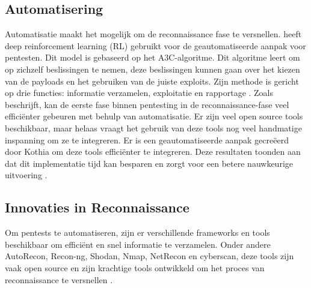 \subsection{Automatisering}
Automatisatie maakt het mogelijk om de reconnaissance fase te versnellen. 
\textcite{Hoang} heeft deep reinforcement learning (RL) gebruikt voor de geautomatiseerde aanpak voor pentesten. 
Dit model is gebaseerd op het A3C-algoritme. Dit algoritme leert om op zichzelf beslissingen te nemen, deze beslissingen kunnen gaan over het kiezen van de payloads en het gebruiken van de juiste exploits. 
Zijn methode is gericht op drie functies: informatie verzamelen, exploitatie en rapportage \autocite{Hoang}.
Zoals \textcite{Kothia} beschrijft, kan de eerste fase binnen pentesting in de reconnaissance-fase veel efficiënter gebeuren met behulp van automatisatie. 
Er zijn veel open source tools beschikbaar, maar helaas vraagt het gebruik van deze tools nog veel handmatige inspanning om ze te integreren.
Er is een geautomatiseerde aanpak gecreëerd door Kothia om deze tools efficiënter te integreren. 
Deze resultaten toonden aan dat dit implementatie tijd kan besparen en zorgt voor een betere nauwkeurige uitvoering \parencite{Kothia}.

\subsection{Innovaties in Reconnaissance}
Om pentests te automatiseren, zijn er verschillende frameworks en tools beschikbaar om efficiënt en snel informatie te verzamelen. 
Onder andere AutoRecon, Recon-ng, Shodan, Nmap, NetRecon en cyberscan, deze tools zijn vaak open source en zijn krachtige tools ontwikkeld om het proces van reconnaissance te versnellen \autocite{Shebli} .

